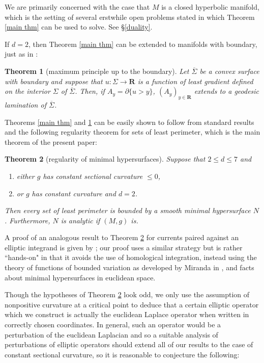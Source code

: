 \documentclass[reqno,12pt,letterpaper]{amsart}
\newcommand{\RR}{\mathbf{R}}
\newtheorem{theorem}{Theorem}[section]
\theoremstyle{definition}
\numberwithin{equation}{section}
\begin{document}
We are primarily concerned with the case that $M$ is a closed hyperbolic manifold, which is the setting of several erstwhile open problems stated in \cite[\S9]{daskalopoulos2020transverse} which Theorem \ref{main thm} can be used to solve. See \S\ref{duality}.

If $d = 2$, then Theorem \ref{main thm} can be extended to manifolds with boundary, just as in \cite[Corollary 3.5]{górny2017planar}:

\begin{theorem}[maximum principle up to the boundary]\label{main crly}
Let $\overline \Sigma$ be a convex surface with boundary and suppose that $u: \Sigma \to \RR$ is a function of least gradient defined on the interior $\Sigma$ of $\overline \Sigma$.
Then, if $A_y = \partial \{u > y\}$, $(A_y)_{y \in \RR}$ extends to a geodesic lamination of $\overline \Sigma$.
\end{theorem}

Theorems \ref{main thm} and \ref{main crly} can be easily shown to follow from standard results and the following regularity theorem for sets of least perimeter, which is the main theorem of the present paper:

\begin{theorem}[regularity of minimal hypersurfaces]\label{main lma}
Suppose that $2 \leq d \leq 7$ and
\begin{enumerate}
\item either $g$ has constant sectional curvature $\leq 0$,
\item or $g$ has constant curvature and $d = 2$.
\end{enumerate}
Then every set of least perimeter is bounded by a smooth minimal hypersurface $N$.
Furthermore, $N$ is analytic if $(M, g)$ is.
\end{theorem}

A proof of an analogous result to Theorem \ref{main lma} for currents paired against an elliptic integrand is given by \cite[\S5.3]{federer2014geometric}; our proof uses a similar strategy but is rather ``hands-on" in that it avoids the use of homological integration, instead using the theory of functions of bounded variation as developed by Miranda in \cite{Miranda64} \cite{Miranda66} \cite{Miranda67}, and facts about minimal hypersurfaces in euclidean space.

Though the hypotheses of Theorem \ref{main lma} look odd, we only use the assumption of nonpositive curvature at a critical point to deduce that a certain elliptic operator which we construct is actually the euclidean Laplace operator when written in correctly chosen coordinates.
In general, such an operator would be a perturbation of the euclidean Laplacian and so a suitable analysis of perturbations of elliptic operators should extend all of our results to the case of constant sectional curvature, so it is reasonable to conjecture the following:
\end{document}

